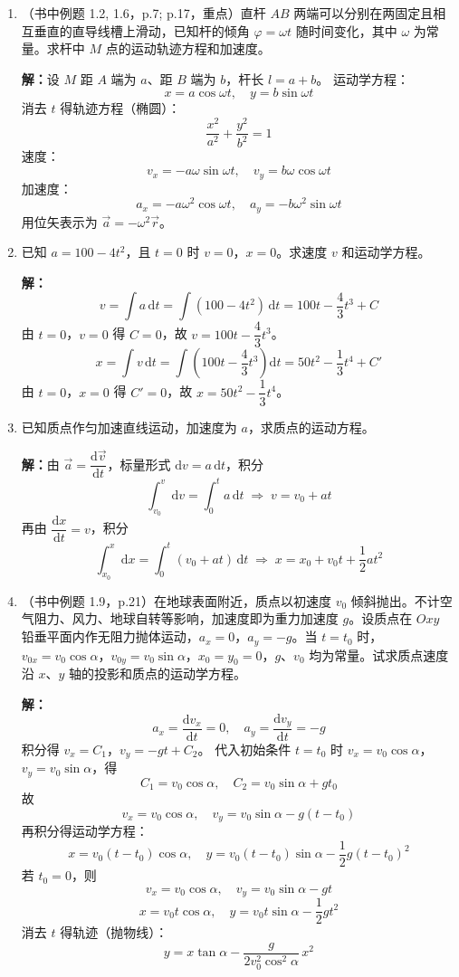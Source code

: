 \documentclass{ctexart}
\begin{document}
\begin{enumerate}
\item（书中例题 1.2, 1.6，p.7; p.17，重点）直杆 $AB$ 两端可以分别在两固定且相互垂直的直导线槽上滑动，已知杆的倾角 $\varphi = \omega t$ 随时间变化，其中 $\omega$ 为常量。求杆中 $M$ 点的运动轨迹方程和加速度。

\textbf{解：}设 $M$ 距 $A$ 端为 $a$、距 $B$ 端为 $b$，杆长 $l = a + b$。
运动学方程：
\[
x = a\cos\omega t,\quad y = b\sin\omega t
\]
消去 $t$ 得轨迹方程（椭圆）：
\[
\frac{x^{2}}{a^{2}} + \frac{y^{2}}{b^{2}} = 1
\]
速度：
\[
v_x = -a\omega\sin\omega t,\quad v_y = b\omega\cos\omega t
\]
加速度：
\[
a_x = -a\omega^{2}\cos\omega t,\quad a_y = -b\omega^{2}\sin\omega t
\]
用位矢表示为 $\vec{a} = -\omega^{2}\vec{r}$。

\item 已知 $a = 100 - 4t^{2}$，且 $t = 0$ 时 $v = 0$，$x = 0$。求速度 $v$ 和运动学方程。

\textbf{解：}
\[
v = \int a\,\mathrm{d}t = \int (100 - 4t^{2})\,\mathrm{d}t = 100t - \frac{4}{3}t^{3} + C
\]
由 $t = 0$，$v = 0$ 得 $C = 0$，故 $v = 100t - \dfrac{4}{3}t^{3}$。
\[
x = \int v\,\mathrm{d}t = \int \left(100t - \frac{4}{3}t^{3}\right)\mathrm{d}t = 50t^{2} - \frac{1}{3}t^{4} + C'
\]
由 $t = 0$，$x = 0$ 得 $C' = 0$，故 $x = 50t^{2} - \dfrac{1}{3}t^{4}$。

\item 已知质点作匀加速直线运动，加速度为 $a$，求质点的运动方程。

\textbf{解：}由 $\vec{a} = \dfrac{\mathrm{d}\vec{v}}{\mathrm{d}t}$，标量形式 $\mathrm{d}v = a\,\mathrm{d}t$，积分
\[
\int_{v_0}^{v} \mathrm{d}v = \int_{0}^{t} a\,\mathrm{d}t \;\Longrightarrow\; v = v_0 + at
\]
再由 $\dfrac{\mathrm{d}x}{\mathrm{d}t} = v$，积分
\[
\int_{x_0}^{x} \mathrm{d}x = \int_{0}^{t} (v_0 + at)\,\mathrm{d}t \;\Longrightarrow\; x = x_0 + v_0 t + \frac12 at^{2}
\]

\item（书中例题 1.9，p.21）在地球表面附近，质点以初速度 $v_0$ 倾斜抛出。不计空气阻力、风力、地球自转等影响，加速度即为重力加速度 $g$。设质点在 $Oxy$ 铅垂平面内作无阻力抛体运动，$a_x = 0$，$a_y = -g$。当 $t = t_0$ 时，$v_{0x} = v_0\cos\alpha$，$v_{0y} = v_0\sin\alpha$，$x_0 = y_0 = 0$，$g$、$v_0$ 均为常量。试求质点速度沿 $x$、$y$ 轴的投影和质点的运动学方程。

\textbf{解：}
\[
a_x = \frac{\mathrm{d}v_x}{\mathrm{d}t} = 0,\quad
a_y = \frac{\mathrm{d}v_y}{\mathrm{d}t} = -g
\]
积分得 $v_x = C_1$，$v_y = -gt + C_2$。
代入初始条件 $t = t_0$ 时 $v_x = v_0\cos\alpha$，$v_y = v_0\sin\alpha$，得
\[
C_1 = v_0\cos\alpha,\quad C_2 = v_0\sin\alpha + gt_0
\]
故
\[
v_x = v_0\cos\alpha,\quad v_y = v_0\sin\alpha - g(t - t_0)
\]
再积分得运动学方程：
\[
x = v_0(t - t_0)\cos\alpha,\quad
y = v_0(t - t_0)\sin\alpha - \frac12 g(t - t_0)^{2}
\]
若 $t_0 = 0$，则
\[
v_x = v_0\cos\alpha,\quad v_y = v_0\sin\alpha - gt
\]
\[
x = v_0 t\cos\alpha,\quad y = v_0 t\sin\alpha - \frac12 gt^{2}
\]
消去 $t$ 得轨迹（抛物线）：
\[
y = x\tan\alpha - \frac{g}{2v_0^{2}\cos^{2}\alpha}\,x^{2}
\]


\end{enumerate}
\end{document}
